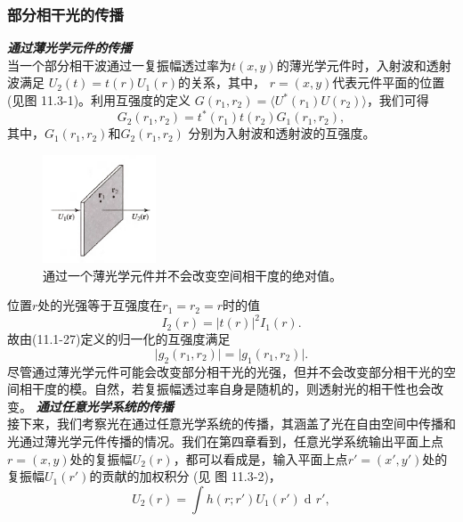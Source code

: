 \documentclass[UTF8]{ctexart}
\numberwithin{figure}{subsection}
\numberwithin{table}{subsection}
\DeclareMathOperator\dif{d\!}
\begin{document}
\subsubsection{部分相干光的传播}
\endgroup
\bigbreak\noindent\textcolor{ksc}{\textbf{\textsl{通过薄光学元件的传播}}}\\
当一个部分相干波通过一复振幅透过率为$t(x,y)$的薄光学元件时，入射波和透射波满足 $U_2 (t) = t(r) U_1 (r)$的关系，其中， $r = (x,y)$代表元件平面的位置(见图 11.3-1)。利用互强度的定义 $G(r_1, r_2) = \langle U^\ast (r_1) U(r_2) \rangle$，我们可得 
\begin{equation}
G_2 (r_1, r_2) = t^\ast (r_1) t(r_2) G_1(r_1, r_2) ,
\end{equation}
其中，$G_1(r_1, r_2)$和$G_2(r_1, r_2)$ 分别为入射波和透射波的互强度。
\begin{figure}[H]
\centering
\includegraphics[width=0.3\textwidth]{11_3_1.PNG}
\caption{通过一个薄光学元件并不会改变空间相干度的绝对值。}
\label{fig: 11_3_1}
\end{figure}
\par 位置$r$处的光强等于互强度在$r_1 =  r_2 = r $时的值
\begin{equation}
I_2 (r) = \lvert t(r) \rvert ^2 I_1 (r) .
\end{equation}
故由(11.1-27)定义的归一化的互强度满足
\begin{equation}
\lvert g_2 (r_1, r_2) \rvert = \lvert g_1 (r_1, r_2) \rvert .
\end{equation}
尽管通过薄光学元件可能会改变部分相干光的光强，但并不会改变部分相干光的空间相干度的模。自然，若复振幅透过率自身是随机的，则透射光的相干性也会改变。
\bigbreak\noindent\textcolor{ksc}{\textbf{\textsl{通过任意光学系统的传播}}}\\
接下来，我们考察光在通过任意光学系统的传播，其涵盖了光在自由空间中传播和光通过薄光学元件传播的情况。我们在第四章看到，任意光学系统输出平面上点 $r = (x,y)$处的复振幅$U_2 (r)$，都可以看成是，输入平面上点$r' = (x', y')$处的复振幅$U_1 (r')$的贡献的加权积分 (见 图 11.3-2)，
\begin{equation}
U_2 (r) = \int h(r; r') U_1 (r') \dif r' ,
\end{equation}
\end{document}
